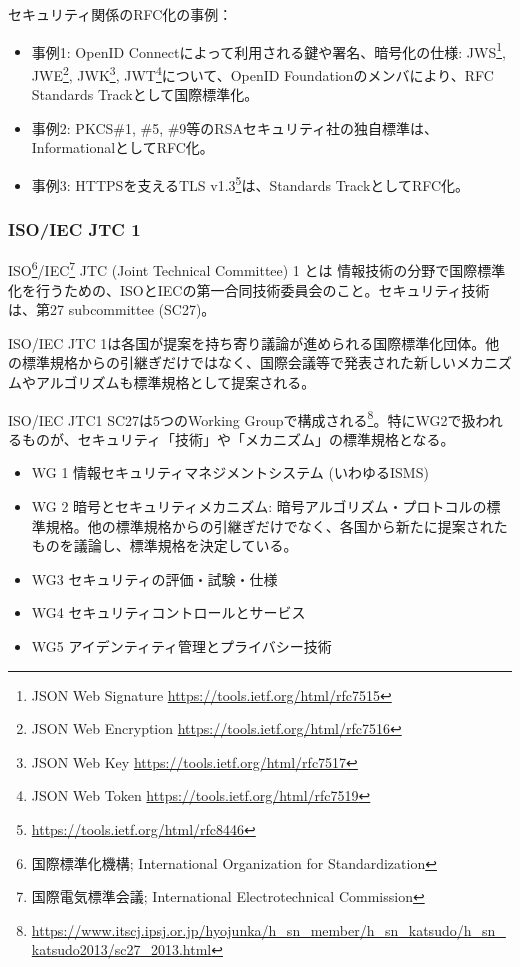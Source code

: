 \documentclass[12pt,dvipdfmx]{beamer}
\begin{document}
\begin{frame}
セキュリティ関係のRFC化の事例：
\begin{itemize}
 \item 事例1: OpenID Connectによって利用される鍵や署名、暗号化の仕様: JWS\footnote[frame]{\scriptsize JSON Web Signature \url{https://tools.ietf.org/html/rfc7515}}, JWE\footnote[frame]{\scriptsize JSON Web Encryption \url{https://tools.ietf.org/html/rfc7516}}, JWK\footnote[frame]{\scriptsize JSON Web Key \url{https://tools.ietf.org/html/rfc7517}}, JWT\footnote[frame]{\scriptsize JSON Web Token \url{https://tools.ietf.org/html/rfc7519}}について、OpenID Foundationのメンバにより、RFC Standards Trackとして国際標準化。
 \item 事例2: PKCS\#1, \#5, \#9等のRSAセキュリティ社の独自標準は、InformationalとしてRFC化。
 \item 事例3: HTTPSを支えるTLS v1.3\footnote[frame]{\scriptsize \url{https://tools.ietf.org/html/rfc8446}}は、Standards TrackとしてRFC化。
\end{itemize}

\end{frame}

\begin{frame}
\frametitle{ISO/IEC JTC 1}
\begin{block}{ISO\footnote[frame]{\scriptsize 国際標準化機構; International Organization for Standardization}/IEC\footnote[frame]{\scriptsize 国際電気標準会議; International Electrotechnical Commission} JTC (Joint Technical Committee) 1 とは}
情報技術の分野で国際標準化を行うための、ISOとIECの第一合同技術委員会のこと。セキュリティ技術は、第27 subcommittee (SC27)。
\end{block}

ISO/IEC JTC 1は各国が提案を持ち寄り議論が進められる国際標準化団体。他の標準規格からの引継ぎだけではなく、国際会議等で発表された新しいメカニズムやアルゴリズムも標準規格として提案される。
\end{frame}

\begin{frame}
ISO/IEC JTC1 SC27は5つのWorking Groupで構成される\footnote[frame]{\scriptsize \url{https://www.itscj.ipsj.or.jp/hyojunka/h_sn_member/h_sn_katsudo/h_sn_katsudo2013/sc27_2013.html}}。特にWG2で扱われるものが、セキュリティ「技術」や「メカニズム」の標準規格となる。

\begin{itemize}
 \item WG 1 情報セキュリティマネジメントシステム (いわゆるISMS)
 \item \alert{WG 2 暗号とセキュリティメカニズム}: 暗号アルゴリズム・プロトコルの標準規格。他の標準規格からの引継ぎだけでなく、各国から新たに提案されたものを議論し、標準規格を決定している。
 \item WG3 セキュリティの評価・試験・仕様
 \item WG4 セキュリティコントロールとサービス
 \item WG5 アイデンティティ管理とプライバシー技術
\end{itemize}

\end{frame}
\end{document}
